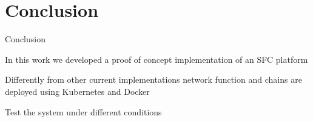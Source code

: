 \section{Conclusion}

\begin{frame}{Conclusion}

\vfill{}

In this work we developed a proof of concept implementation of an SFC platform

\vfill{}

Differently from other current implementations network function and chains are
deployed using Kubernetes and Docker

\vfill{}

Test the system under different conditions

\vfill{}

\end{frame}